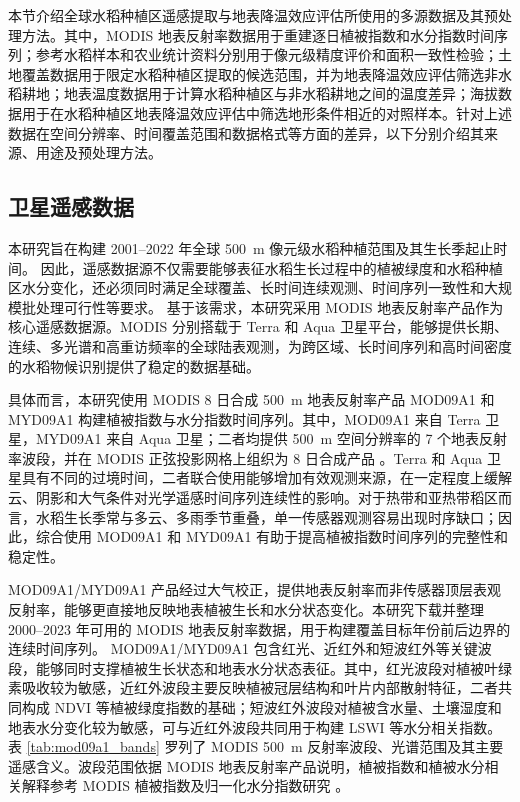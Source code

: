 本节介绍全球水稻种植区遥感提取与地表降温效应评估所使用的多源数据及其预处理方法。其中，MODIS 地表反射率数据用于重建逐日植被指数和水分指数时间序列；参考水稻样本和农业统计资料分别用于像元级精度评价和面积一致性检验；土地覆盖数据用于限定水稻种植区提取的候选范围，并为地表降温效应评估筛选非水稻耕地；地表温度数据用于计算水稻种植区与非水稻耕地之间的温度差异；海拔数据用于在水稻种植区地表降温效应评估中筛选地形条件相近的对照样本。针对上述数据在空间分辨率、时间覆盖范围和数据格式等方面的差异，以下分别介绍其来源、用途及预处理方法。

\subsection{卫星遥感数据}
\label{sec:vi_preprocess}

本研究旨在构建 2001--2022 年全球 500~m 像元级水稻种植范围及其生长季起止时间。
因此，遥感数据源不仅需要能够表征水稻生长过程中的植被绿度和水稻种植区水分变化，还必须同时满足全球覆盖、长时间连续观测、时间序列一致性和大规模批处理可行性等要求。
基于该需求，本研究采用 MODIS 地表反射率产品作为核心遥感数据源。MODIS 分别搭载于 Terra 和 Aqua 卫星平台，能够提供长期、连续、多光谱和高重访频率的全球陆表观测，为跨区域、长时间序列和高时间密度的水稻物候识别提供了稳定的数据基础。

具体而言，本研究使用 MODIS 8 日合成 500~m 地表反射率产品 MOD09A1 和 MYD09A1 构建植被指数与水分指数时间序列。其中，MOD09A1 来自 Terra 卫星，MYD09A1 来自 Aqua 卫星；二者均提供 500~m 空间分辨率的 7 个地表反射率波段，并在 MODIS 正弦投影网格上组织为 8 日合成产品 \cite{Vermote2015MOD09UserGuide,Vermote2021MOD09A1,Vermote2021MYD09A1}。Terra 和 Aqua 卫星具有不同的过境时间，二者联合使用能够增加有效观测来源，在一定程度上缓解云、阴影和大气条件对光学遥感时间序列连续性的影响。对于热带和亚热带稻区而言，水稻生长季常与多云、多雨季节重叠，单一传感器观测容易出现时序缺口；因此，综合使用 MOD09A1 和 MYD09A1 有助于提高植被指数时间序列的完整性和稳定性。

MOD09A1/MYD09A1 产品经过大气校正，提供地表反射率而非传感器顶层表观反射率，能够更直接地反映地表植被生长和水分状态变化。本研究下载并整理 2000--2023 年可用的 MODIS 地表反射率数据，用于构建覆盖目标年份前后边界的连续时间序列。
MOD09A1/MYD09A1 包含红光、近红外和短波红外等关键波段，能够同时支撑植被生长状态和地表水分状态表征。其中，红光波段对植被叶绿素吸收较为敏感，近红外波段主要反映植被冠层结构和叶片内部散射特征，二者共同构成 NDVI 等植被绿度指数的基础；短波红外波段对植被含水量、土壤湿度和地表水分变化较为敏感，可与近红外波段共同用于构建 LSWI 等水分相关指数。
表 \ref{tab:mod09a1_bands} 罗列了 MODIS 500~m 反射率波段、光谱范围及其主要遥感含义。波段范围依据 MODIS 地表反射率产品说明，植被指数和植被水分相关解释参考 MODIS 植被指数及归一化水分指数研究 \cite{Vermote2015MOD09UserGuide,Huete2002,Gao1996}。

